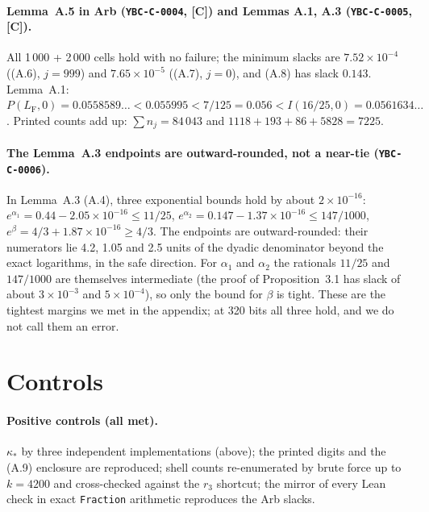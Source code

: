 \documentclass[11pt]{article}
\newcommand{\tier}[1]{\textsf{[#1]}}
\newcommand{\tC}{\tier{C}}
\newcommand{\lean}[1]{\texttt{#1}}
\newcommand{\LF}{L_{\mathrm F}}
\newcommand{\ks}{\kappa_*}
\begin{document}
\paragraph{Lemma~A.5 in Arb (\texttt{YBC-C-0004}, \tC) and Lemmas A.1, A.3 (\texttt{YBC-C-0005}, \tC).}
All 1\,000 + 2\,000 cells hold with no failure; the minimum slacks are $7.52\times10^{-4}$ ((A.6), $j=999$) and $7.65\times10^{-5}$ ((A.7), $j=0$), and (A.8) has slack $0.143$. Lemma~A.1: $P(\LF,0)=0.0558589\ldots<0.055995<7/125=0.056<I(16/25,0)=0.0561634\ldots$.
Printed counts add up: $\sum n_j=84\,043$ and $1118+193+86+5828=7225$.

\paragraph{The Lemma~A.3 endpoints are outward-rounded, not a near-tie (\texttt{YBC-C-0006}).} In Lemma~A.3 (A.4), three exponential bounds hold by about $2\times10^{-16}$:
$e^{\alpha_1}=0.44-2.05\times10^{-16}\le11/25$, $e^{\alpha_2}=0.147-1.37\times10^{-16}\le147/1000$, $e^{\beta}=4/3+1.87\times10^{-16}\ge4/3$. The endpoints are outward-rounded: their numerators lie
4.2, 1.05 and 2.5 units of the dyadic denominator beyond the exact logarithms, in the safe direction. For $\alpha_1$ and $\alpha_2$ the rationals
$11/25$ and $147/1000$ are themselves intermediate (the proof of Proposition~3.1 has slack of about $3\times10^{-3}$ and $5\times10^{-4}$), so only the bound for
$\beta$ is tight. These are the tightest margins we met in the appendix; at 320 bits all three hold, and we do not call them an error.

\section{Controls}\label{sec:controls}
\paragraph{Positive controls (all met).} $\ks$ by three independent implementations (above); the printed digits and the (A.9) enclosure are reproduced; shell counts re-enumerated by brute force up to $k=4200$ and cross-checked
against the $r_3$ shortcut; the mirror of every Lean check in exact \lean{Fraction} arithmetic reproduces the Arb slacks.
\end{document}
